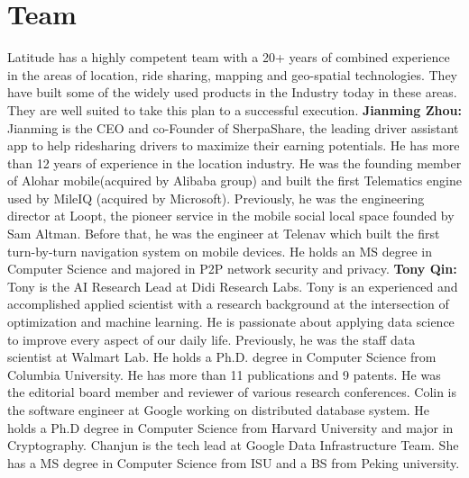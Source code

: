 \section{Team}

Latitude has a highly competent team with a 20+ years of combined experience in the areas of location, ride sharing, mapping and
geo-spatial technologies. They have built some of the widely used products in the Industry today in these areas. They are well suited to take this plan to a successful execution.
\newline
\newline
\noindent
{\bf Jianming Zhou:}
Jianming is the CEO and co-Founder of SherpaShare, the leading driver assistant app to help ridesharing drivers to
maximize their earning potentials. He has more than 12 years of experience in the location industry. He was the founding
member of Alohar mobile(acquired by Alibaba group) and built the first Telematics engine used by MileIQ (acquired by
Microsoft). Previously, he was the engineering director at Loopt, the pioneer service in the mobile social local space
founded by Sam Altman. Before that, he was the engineer at Telenav which built the first turn-by-turn navigation system
on mobile devices. He holds an MS degree in Computer Science and majored in P2P network security and privacy.
\newline
\newline
\noindent
{\bf Tony Qin:}
Tony is the AI Research Lead at Didi Research Labs. Tony is an experienced and accomplished applied scientist with a
research background at the intersection of optimization and machine learning. He is passionate about applying data
science to improve every aspect of our daily life. Previously, he was the staff data scientist at Walmart Lab. He holds
a Ph.D. degree in Computer Science from Columbia University. He has more than 11 publications and 9 patents. He was the
editorial board member and reviewer of various research conferences.
\newline
\newline
{}
Colin is the software engineer at Google working on distributed database system. He
holds a Ph.D degree in Computer Science from Harvard University and major in Cryptography.
\newline
\newline
{} Chanjun is the tech lead at Google Data Infrastructure Team. She has a MS degree in
Computer Science from ISU and a BS from Peking university. 
\newline

